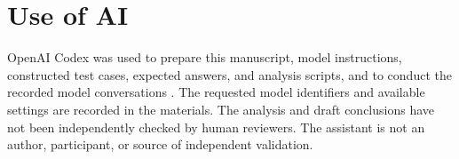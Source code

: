 \documentclass[10pt,conference]{IEEEtran}
\begin{document}
\section*{Use of AI}
OpenAI Codex was used to prepare this manuscript, model instructions, constructed test cases, expected answers, and analysis scripts, and to conduct the recorded model conversations \cite{openai_codex_execution}. The requested model identifiers and available settings are recorded in the materials. The analysis and draft conclusions have not been independently checked by human reviewers. The assistant is not an author, participant, or source of independent validation.



\end{document}
